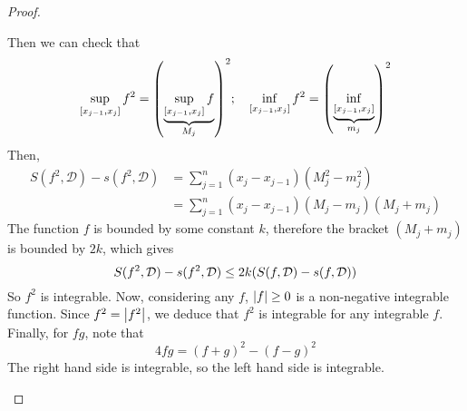 \begin{proof}
\begin{enumerate}[(1)]
		      Then we can check that
		      \[
			      \sup_{[x_{j-1}, x_j]} f^2 = \qty(\underbrace{\sup_{[x_{j-1}, x_j]} f}_{M_j})^2;\quad \inf_{[x_{j-1}, x_j]} f^2 = \qty(\underbrace{\inf_{[x_{j-1}, x_j]}}_{m_j})^2
		      \]
		      Then,
		      \begin{align*}
			      S(f^2, \mathcal D) - s(f^2, \mathcal D) & = \sum_{j=1}^n (x_j - x_{j-1})(M_j^2 - m_j^2)        \\
			                                              & = \sum_{j=1}^n (x_j - x_{j-1})(M_j - m_j)(M_j + m_j)
		      \end{align*}
		      The function \(f\) is bounded by some constant \(k\), therefore the bracket \((M_j + m_j)\) is bounded by \(2k\), which gives
		      \[
			      S(f^2, \mathcal D) - s(f^2, \mathcal D) \leq 2k\qty(S(f, \mathcal D) - s(f, \mathcal D))
		      \]
		      So \(f^2\) is integrable.
		      Now, considering any \(f\), \(\abs{f} \geq 0\) is a non-negative integrable function.
		      Since \(f^2 = \abs{f^2}\), we deduce that \(f^2\) is integrable for any integrable \(f\).
		      Finally, for \(fg\), note that
		      \[
			      4fg = (f + g)^2 - (f - g)^2
		      \]
		      The right hand side is integrable, so the left hand side is integrable.
	\end{enumerate}
\end{proof}
